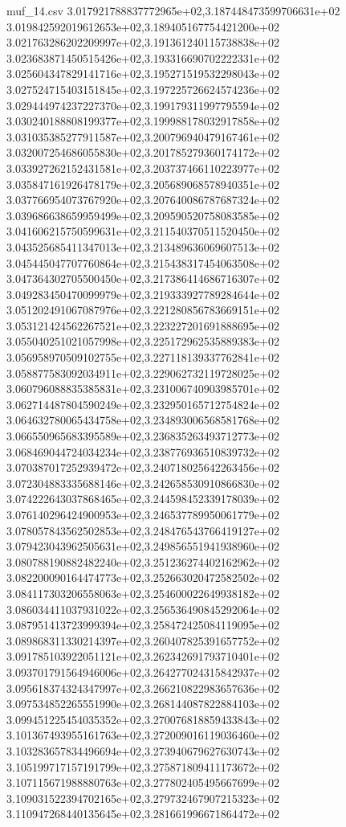 \begin{filecontents*}{muf_14.csv}
3.017921788837772965e+02,3.187448473599706631e+02
3.019842592019612653e+02,3.189405167754421200e+02
3.021763286202209997e+02,3.191361240115738838e+02
3.023683871450515426e+02,3.193316690702222331e+02
3.025604347829141716e+02,3.195271519532298043e+02
3.027524715403151845e+02,3.197225726624574236e+02
3.029444974237227370e+02,3.199179311997795594e+02
3.030240188808199377e+02,3.199988178032917858e+02
3.031035385277911587e+02,3.200796940479167461e+02
3.032007254686055830e+02,3.201785279360174172e+02
3.033927262152431581e+02,3.203737466110223977e+02
3.035847161926478179e+02,3.205689068578940351e+02
3.037766954073767920e+02,3.207640086787687324e+02
3.039686638659959499e+02,3.209590520758083585e+02
3.041606215750599631e+02,3.211540370511520450e+02
3.043525685411347013e+02,3.213489636069607513e+02
3.045445047707760864e+02,3.215438317454063508e+02
3.047364302705500450e+02,3.217386414686716307e+02
3.049283450470099979e+02,3.219333927789284644e+02
3.051202491067087976e+02,3.221280856783669151e+02
3.053121424562267521e+02,3.223227201691888695e+02
3.055040251021057998e+02,3.225172962535889383e+02
3.056958970509102755e+02,3.227118139337762841e+02
3.058877583092034911e+02,3.229062732119728025e+02
3.060796088835385831e+02,3.231006740903985701e+02
3.062714487804590249e+02,3.232950165712754824e+02
3.064632780065434758e+02,3.234893006568581768e+02
3.066550965683395589e+02,3.236835263493712773e+02
3.068469044724034234e+02,3.238776936510839732e+02
3.070387017252939472e+02,3.240718025642263456e+02
3.072304883335688146e+02,3.242658530910866830e+02
3.074222643037868465e+02,3.244598452339178039e+02
3.076140296424900953e+02,3.246537789950061779e+02
3.078057843562502853e+02,3.248476543766419127e+02
3.079423043962505631e+02,3.249856551941938960e+02
3.080788190882482240e+02,3.251236274402162962e+02
3.082200090164474773e+02,3.252663020472582502e+02
3.084117303206558063e+02,3.254600022649938182e+02
3.086034411037931022e+02,3.256536490845292064e+02
3.087951413723999394e+02,3.258472425084119095e+02
3.089868311330214397e+02,3.260407825391657752e+02
3.091785103922051121e+02,3.262342691793710401e+02
3.093701791564946006e+02,3.264277024315842937e+02
3.095618374324347997e+02,3.266210822983657636e+02
3.097534852265551990e+02,3.268144087822884103e+02
3.099451225454035352e+02,3.270076818859433843e+02
3.101367493955161763e+02,3.272009016119036460e+02
3.103283657834496694e+02,3.273940679627630743e+02
3.105199717157191799e+02,3.275871809411173672e+02
3.107115671988880763e+02,3.277802405495667699e+02
3.109031522394702165e+02,3.279732467907215323e+02
3.110947268440135645e+02,3.281661996671864472e+02

\end{filecontents*}
